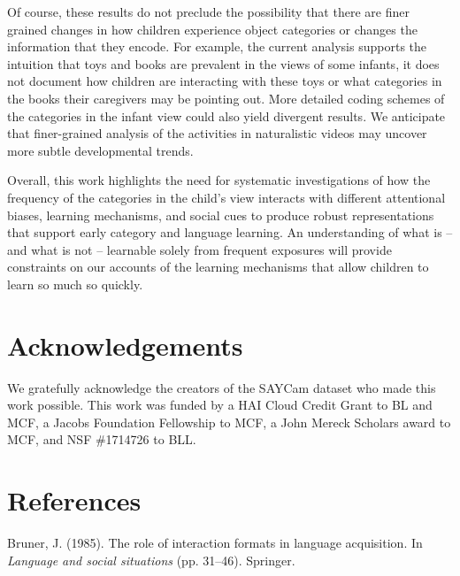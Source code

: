 \documentclass[10pt, letterpaper]{article}
\begin{document}
Of course, these results do not preclude the possibility that there are
finer grained changes in how children experience object categories or
changes the information that they encode. For example, the current
analysis supports the intuition that toys and books are prevalent in the
views of some infants, it does not document how children are interacting
with these toys or what categories in the books their caregivers may be
pointing out. More detailed coding schemes of the categories in the
infant view could also yield divergent results. We anticipate that
finer-grained analysis of the activities in naturalistic videos may
uncover more subtle developmental trends.

Overall, this work highlights the need for systematic investigations of
how the frequency of the categories in the child's view interacts with
different attentional biases, learning mechanisms, and social cues to
produce robust representations that support early category and language
learning. An understanding of what is -- and what is not -- learnable
solely from frequent exposures will provide constraints on our accounts
of the learning mechanisms that allow children to learn so much so
quickly.

\vspace{1em}

\vspace{1em}

\hypertarget{acknowledgements}{%
\section{Acknowledgements}\label{acknowledgements}}

We gratefully acknowledge the creators of the SAYCam dataset who made
this work possible. This work was funded by a HAI Cloud Credit Grant to
BL and MCF, a Jacobs Foundation Fellowship to MCF, a John Mereck
Scholars award to MCF, and NSF \#1714726 to BLL.

\hypertarget{references}{%
\section{References}\label{references}}

\setlength{\parindent}{-0.1in}
\setlength{\leftskip}{0.125in}

\noindent

\hypertarget{refs}{}
\leavevmode\hypertarget{ref-bruner1985role}{}%
Bruner, J. (1985). The role of interaction formats in language
acquisition. In \emph{Language and social situations} (pp. 31--46).
Springer.
\end{document}
